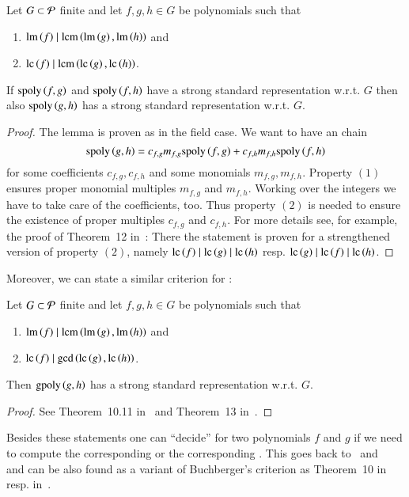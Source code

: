 \begin{lemma}
Let $G \subset \mathcal{P}$ finite and let $f,g,h \in G$ be polynomials such that
\begin{enumerate}
\item $\operatorname{lm}\left({f}\right) \mid \operatorname{lcm}\left(\operatorname{lm}\left({g}\right), \operatorname{lm}\left({h}\right)\right)$ and
\item $\mathrm{lc}\left({f}\right) \mid \operatorname{lcm}\left(\mathrm{lc}\left({g}\right), \mathrm{lc}\left({h}\right)\right)$.
\end{enumerate}
If $\mathrm{spoly}\left({f},{g}\right)$ and $\mathrm{spoly}\left({f},{h}\right)$ have a strong standard representation w.r.t.
$G$ then also $\mathrm{spoly}\left({g},{h}\right)$ has a strong standard representation w.r.t. $G$.
\label{thm:chain-crit}
\end{lemma}

\begin{proof}
The lemma is proven as in the field case. We want to have an \spt chain
\[\mathrm{spoly}\left({g},{h}\right) = c_{f,g} m_{f,g} \mathrm{spoly}\left({f},{g}\right) + c_{f,h} m_{f,h} \mathrm{spoly}\left({f},{h}\right)\]
for some coefficients $c_{f,g}, c_{f,h}$ and  some monomials $m_{f,g}, m_{f,h}$.
Property $(1)$ ensures proper monomial multiples $m_{f,g}$ and $m_{f,h}$.
Working over the integers we have to take care of the coefficients, too. Thus
property $(2)$ is needed to ensure the existence of proper multiples $c_{f,g}$
and $c_{f,h}$. For more details see, for example, the proof of Theorem~12
in~\cite{lichtblau2012}: There the statement is proven for a strengthened
version of property $(2)$, namely $\mathrm{lc}\left({f}\right) \mid \mathrm{lc}\left({g}\right) \mid \mathrm{lc}\left({h}\right)$ resp. $\mathrm{lc}\left({g}\right)
\mid \mathrm{lc}\left({f}\right) \mid \mathrm{lc}\left({h}\right)$.
\end{proof}

Moreover, we can state a similar criterion for \gpts:

\begin{lemma}
Let $G \subset \mathcal{P}$ finite and let $f,g,h \in G$ be polynomials such that
\begin{enumerate}
\item $\operatorname{lm}\left({f}\right) \mid \operatorname{lcm}\left(\operatorname{lm}\left({g}\right), \operatorname{lm}\left({h}\right)\right)$ and
\item $\mathrm{lc}\left({f}\right) \mid \gcd\left(\mathrm{lc}\left({g}\right), \mathrm{lc}\left({h}\right)\right)$.
\end{enumerate}
Then $\mathrm{gpoly}\left({g},{h}\right)$ has a strong standard representation w.r.t. $G$.
\label{thm:chain-crit-gcd}
\end{lemma}

\begin{proof}
See Theorem~10.11 in~\cite{bwkGroebnerBases1993} and Theorem~13
in~\cite{lichtblau2012}.
\end{proof}

Besides these statements one can ``decide'' for two polynomials $f$ and
$g$ if we need to compute the corresponding \gpt or the corresponding \spt.
This goes back to~\cite{kapur1988} and~\cite{PAN1989} and can be also found as a variant of
Buchberger's criterion as Theorem~10 in~\cite{lichtblau2012} resp.
in~\cite{mora_2016}.


